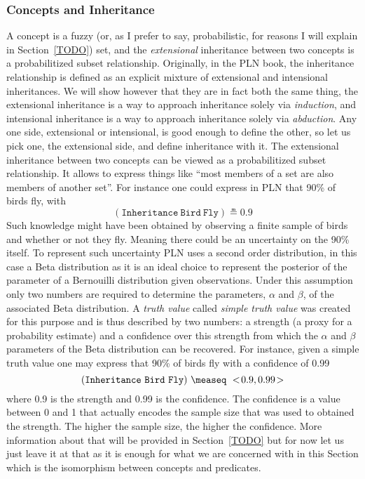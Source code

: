 \documentclass[]{article}
\begin{document}
\subsubsection{Concepts and Inheritance}
A concept is a fuzzy (or, as I prefer to say, probabilistic, for
reasons I will explain in Section~\ref{TODO}) set, and the
\emph{extensional} inheritance between two concepts is a
probabilitized subset relationship.  Originally, in the PLN book, the
inheritance relationship is defined as an explicit mixture of
extensional and intensional inheritances. We will show however that
they are in fact both the same thing, the extensional inheritance is a
way to approach inheritance solely via \emph{induction}, and
intensional inheritance is a way to approach inheritance solely via
\emph{abduction}.  Any one side, extensional or intensional, is good
enough to define the other, so let us pick one, the extensional side,
and define inheritance with it.  The extensional inheritance between
two concepts can be viewed as a probabilitized subset relationship.
It allows to express things like ``most members of a set are also
members of another set''.  For instance one could express in PLN that
90\% of birds fly, with
$$(\texttt{Inheritance}\ \texttt{Bird}\ \texttt{Fly}) \measeq 0.9$$
Such knowledge might have been obtained by observing a finite sample
of birds and whether or not they fly.  Meaning there could be an
uncertainty on the 90\% itself.  To represent such uncertainty PLN
uses a second order distribution, in this case a Beta distribution as
it is an ideal choice to represent the posterior of the parameter of a
Bernouilli distribution given observations.  Under this assumption
only two numbers are required to determine the parameters, $\alpha$
and $\beta$, of the associated Beta distribution.  A \emph{truth
value} called \emph{simple truth value} was created for this purpose
and is thus described by two numbers: a strength (a proxy for a
probability estimate) and a confidence over this strength from which
the $\alpha$ and $\beta$ parameters of the Beta distribution can be
recovered.  For instance, given a simple truth value one may express
that 90\% of birds fly with a confidence of 0.99
$$(\texttt{Inheritance}\ \texttt{Bird}\ \texttt{Fly})\ \measeq\ \STV{0.9}{0.99}$$
where 0.9 is the strength and 0.99 is the confidence.  The confidence
is a value between 0 and 1 that actually encodes the sample size that
was used to obtained the strength.  The higher the sample size, the
higher the confidence.  More information about that will be provided
in Section~\ref{TODO} but for now let us just leave it at that as it
is enough for what we are concerned with in this Section which is the
isomorphism between concepts and predicates.
\end{document}
